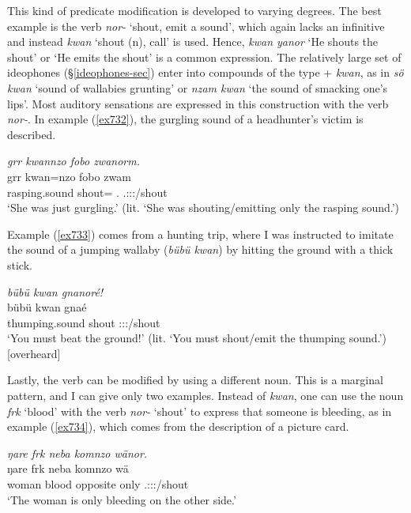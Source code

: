 This kind of predicate modification is developed to varying degrees. The best example is the  verb \emph{nor-} `shout, emit a sound', which again lacks an infinitive and instead \emph{kwan} `shout (n), call' is used. Hence, \emph{kwan yanor} `He shouts the shout' or `He emits the shout' is a common expression. The relatively large set of ideophones ({\S}\ref{ideophones-sec}) enter into compounds of the type  + \emph{kwan}, as in \emph{sö kwan} `sound of wallabies grunting' or \emph{nzam kwan} `the sound of smacking one's lips'. Most auditory sensations are expressed in this construction with the verb \emph{nor-}. In example (\ref{ex732}), the gurgling sound of a headhunter's victim is described.

\begin{exe}
	\ex \emph{grr kwannzo fobo zwanorm.}\\
	\gll grr kwan=nzo fobo zwam\\
	rasping.sound shout={\Only} {\Dist}.{\All} \Tsg.\F:\Sbj:\Pst:\Dur/shout\\
	\trans `She was just gurgling.' (lit. `She was shouting/emitting only the rasping sound.')\\
	\label{ex732}
\end{exe}

Example (\ref{ex733}) comes from a hunting trip, where I was instructed to imitate the sound of a jumping wallaby (\emph{bübü kwan}) by hitting the ground with a thick stick.

\begin{exe}
	\ex \emph{bübü kwan gnanoré!}\\
	\gll bübü kwan gnaé\\
	thumping.sound shout \Ssg:\Sbj:\Imp:\Ipfv/shout\\
	\trans `You must beat the ground!' (lit. `You must shout/emit the thumping sound.')\\{\hspace*{1pt}\hfill{\footnotesize{[overheard]}}}
	\label{ex733}
\end{exe}

Lastly, the verb can be modified by using a different noun. This is a marginal pattern, and I can give only two examples. Instead of \emph{kwan}, one can use the noun \emph{frk} `blood' with the verb \emph{nor-} `shout' to express that someone is bleeding, as in example (\ref{ex734}), which comes from the description of a picture card.

\begin{exe}
	\ex \emph{ŋare frk neba komnzo wänor.}\\
	\gll ŋare frk neba komnzo wä\\
	woman blood opposite only \Tsg.\F:\Sbj:\Nonpast:\Ipfv/shout\\
	\trans `The woman is only bleeding on the other side.'
	\label{ex734}
\end{exe}


